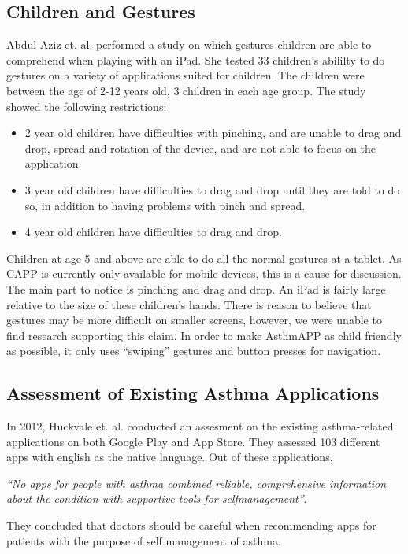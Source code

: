 \subsection{Children and Gestures}

Abdul Aziz et. al.\cite{aziz2013children} performed a study on which gestures children are able to comprehend when playing with an iPad. She tested 33 children's abililty to do gestures on a variety of applications suited for children. The children were between the age of 2-12 years old, 3 children in each age group. The study showed the following restrictions:

\begin{itemize}
  \item 2 year old children have difficulties with pinching, and are unable to drag and drop, spread and rotation of the device, and are not able to focus on the application. 
  \item 3 year old children have difficulties to drag and drop until they are told to do so, in addition to having problems with pinch and spread. 
  \item 4 year old children have difficulties to drag and drop. 
\end{itemize}
Children at age 5 and above are able to do all the normal gestures at a tablet. As CAPP is currently only available for mobile devices, this is a cause for discussion. The main part to notice is pinching and drag and drop. An iPad is fairly large relative to the size of these children's hands. There is reason to believe that gestures may be more difficult on smaller screens, however, we were unable to find research supporting this claim. In order to make AsthmAPP as child friendly as possible, it only uses ``swiping'' gestures and button presses for navigation.

\subsection{Assessment of Existing Asthma Applications}
In 2012, Huckvale et. al.\cite{huckvale2012apps} conducted an assesment on the existing asthma-related applications on both Google Play and App Store. They assessed 103 different apps with english as the native language. Out of these applications, 


\emph{``No apps for people with asthma combined reliable, comprehensive information about the condition with supportive tools for self­management''}\cite{huckvale2012apps}. 


They concluded that doctors should be careful when recommending apps for patients with the purpose of self management of asthma.